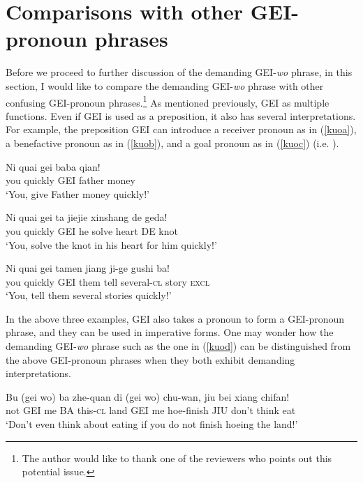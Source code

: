 \documentclass[output=paper,colorlinks,citecolor=brown]{langscibook}
\begin{document}
\section{Comparisons with other GEI-pronoun phrases}\label{sect4}

Before we proceed to further discussion of the demanding GEI-\textit{wo} phrase, in this section, I would like to compare the demanding GEI-\textit{wo} phrase with other confusing GEI-pronoun phrases.\footnote{The author would like to thank one of the reviewers who points out this potential issue.} As mentioned previously, GEI as multiple functions. Even if GEI is used as a preposition, it also has several interpretations. For example, the preposition GEI can introduce a receiver pronoun as in (\ref{kuoa}), a benefactive pronoun as in (\ref{kuob}), and a goal pronoun as in (\ref{kuoc}) (i.e. \citealt{Liu&Pan&Gu}). 

\ea
\label{kuoa}
\gll Ni     quai    gei baba    qian!\\  
     you    quickly GEI father  money\\ 
\glt `You, give Father money quickly!'
\z

\ea
\label{kuob}
\gll Ni     quai    gei ta  jiejie  xinshang    de  geda!\\  
     you    quickly GEI he  solve   heart       DE  knot\\ 
\glt `You, solve the knot in his heart for him quickly!'
\z

\ea
\label{kuoc}
\gll Ni     quai    gei tamen   jiang   ji-ge       gushi   ba!\\  
     you    quickly GEI them      tell    several-\textsc{cl}  story   \textsc{excl}\\ 
\glt `You, tell them several stories quickly!'
\z

In the above three examples, GEI also takes a pronoun to form a GEI-pronoun phrase, and they can be used in imperative forms. One may wonder how the demanding GEI-\textit{wo} phrase such as the one in (\ref{kuod}) can be distinguished from the above GEI-pronoun phrases when they both exhibit demanding interpretations.

\ea
\label{kuod}
\gll Bu     (gei wo)    ba zhe-quan di 	    (gei wo) chu-wan,   jiu bei 	xiang	chifan!\\  
     not    GEI me      BA this-\textsc{cl}  land    GEI me   hoe-finish JIU don't   think    eat   \\ 
\glt `Don't even think about eating if you do not finish hoeing the land!'
\z
\end{document}
